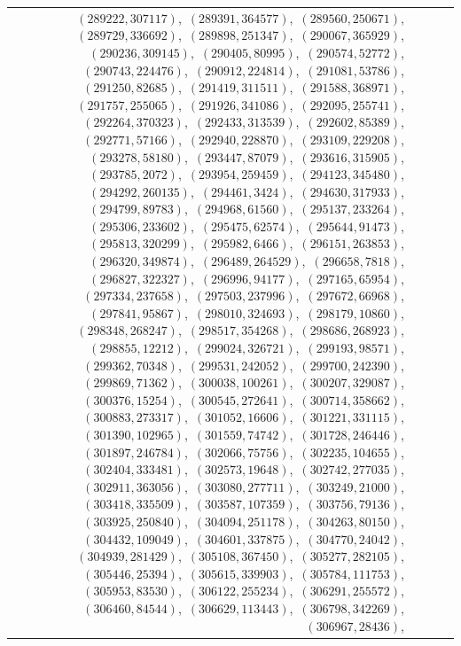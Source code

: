\documentclass[11pt]{article}
\begin{document}
\begin{longtable}{@{}rrl>{\raggedright\arraybackslash}p{}@{}}
$(289222,307117)$,\allowbreak\ $(289391,364577)$,\allowbreak\ $(289560,250671)$,\allowbreak\ $(289729,336692)$,\allowbreak\ $(289898,251347)$,\allowbreak\ $(290067,365929)$,\allowbreak\ $(290236,309145)$,\allowbreak\ $(290405,80995)$,\allowbreak\ $(290574,52772)$,\allowbreak\ $(290743,224476)$,\allowbreak\ $(290912,224814)$,\allowbreak\ $(291081,53786)$,\allowbreak\ $(291250,82685)$,\allowbreak\ $(291419,311511)$,\allowbreak\ $(291588,368971)$,\allowbreak\ $(291757,255065)$,\allowbreak\ $(291926,341086)$,\allowbreak\ $(292095,255741)$,\allowbreak\ $(292264,370323)$,\allowbreak\ $(292433,313539)$,\allowbreak\ $(292602,85389)$,\allowbreak\ $(292771,57166)$,\allowbreak\ $(292940,228870)$,\allowbreak\ $(293109,229208)$,\allowbreak\ $(293278,58180)$,\allowbreak\ $(293447,87079)$,\allowbreak\ $(293616,315905)$,\allowbreak\ $(293785,2072)$,\allowbreak\ $(293954,259459)$,\allowbreak\ $(294123,345480)$,\allowbreak\ $(294292,260135)$,\allowbreak\ $(294461,3424)$,\allowbreak\ $(294630,317933)$,\allowbreak\ $(294799,89783)$,\allowbreak\ $(294968,61560)$,\allowbreak\ $(295137,233264)$,\allowbreak\ $(295306,233602)$,\allowbreak\ $(295475,62574)$,\allowbreak\ $(295644,91473)$,\allowbreak\ $(295813,320299)$,\allowbreak\ $(295982,6466)$,\allowbreak\ $(296151,263853)$,\allowbreak\ $(296320,349874)$,\allowbreak\ $(296489,264529)$,\allowbreak\ $(296658,7818)$,\allowbreak\ $(296827,322327)$,\allowbreak\ $(296996,94177)$,\allowbreak\ $(297165,65954)$,\allowbreak\ $(297334,237658)$,\allowbreak\ $(297503,237996)$,\allowbreak\ $(297672,66968)$,\allowbreak\ $(297841,95867)$,\allowbreak\ $(298010,324693)$,\allowbreak\ $(298179,10860)$,\allowbreak\ $(298348,268247)$,\allowbreak\ $(298517,354268)$,\allowbreak\ $(298686,268923)$,\allowbreak\ $(298855,12212)$,\allowbreak\ $(299024,326721)$,\allowbreak\ $(299193,98571)$,\allowbreak\ $(299362,70348)$,\allowbreak\ $(299531,242052)$,\allowbreak\ $(299700,242390)$,\allowbreak\ $(299869,71362)$,\allowbreak\ $(300038,100261)$,\allowbreak\ $(300207,329087)$,\allowbreak\ $(300376,15254)$,\allowbreak\ $(300545,272641)$,\allowbreak\ $(300714,358662)$,\allowbreak\ $(300883,273317)$,\allowbreak\ $(301052,16606)$,\allowbreak\ $(301221,331115)$,\allowbreak\ $(301390,102965)$,\allowbreak\ $(301559,74742)$,\allowbreak\ $(301728,246446)$,\allowbreak\ $(301897,246784)$,\allowbreak\ $(302066,75756)$,\allowbreak\ $(302235,104655)$,\allowbreak\ $(302404,333481)$,\allowbreak\ $(302573,19648)$,\allowbreak\ $(302742,277035)$,\allowbreak\ $(302911,363056)$,\allowbreak\ $(303080,277711)$,\allowbreak\ $(303249,21000)$,\allowbreak\ $(303418,335509)$,\allowbreak\ $(303587,107359)$,\allowbreak\ $(303756,79136)$,\allowbreak\ $(303925,250840)$,\allowbreak\ $(304094,251178)$,\allowbreak\ $(304263,80150)$,\allowbreak\ $(304432,109049)$,\allowbreak\ $(304601,337875)$,\allowbreak\ $(304770,24042)$,\allowbreak\ $(304939,281429)$,\allowbreak\ $(305108,367450)$,\allowbreak\ $(305277,282105)$,\allowbreak\ $(305446,25394)$,\allowbreak\ $(305615,339903)$,\allowbreak\ $(305784,111753)$,\allowbreak\ $(305953,83530)$,\allowbreak\ $(306122,255234)$,\allowbreak\ $(306291,255572)$,\allowbreak\ $(306460,84544)$,\allowbreak\ $(306629,113443)$,\allowbreak\ $(306798,342269)$,\allowbreak\ $(306967,28436)$,\allowbreak\ 
\end{longtable}
\end{document}
